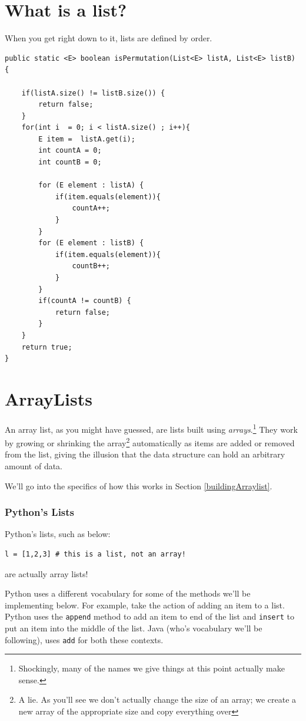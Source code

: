 \documentclass[10pt,a4paper]{book}
\begin{document}
\section{What is a list?}
When you get right down to it, lists are defined by order.


\begin{verbatim}
public static <E> boolean isPermutation(List<E> listA, List<E> listB) {
	
	if(listA.size() != listB.size()) {
		return false;
	}
	for(int i  = 0; i < listA.size() ; i++){
		E item =  listA.get(i);
		int countA = 0;
		int countB = 0;
		
		for (E element : listA) {
			if(item.equals(element)){
				countA++;
			}
		}
		for (E element : listB) {
			if(item.equals(element)){
				countB++;
			}
		}
		if(countA != countB) {
			return false;
		}
	}
	return true;
}
\end{verbatim}



\section{ArrayLists}
An array list, as you might have guessed, are lists built using \textit{arrays}.\footnote{Shockingly, many of the names we give things at this point actually make sense.}
They work by growing or shrinking the array\footnote{A lie.  As you'll see we don't actually change the size of an array;  we create a new array of the appropriate size and copy everything over} automatically as items are added or removed from the list, giving the illusion that the data structure can hold an arbitrary amount of data.

We'll go into the specifics of how this works in Section \ref{buildingArraylist}.


\subsubsection{Python's Lists}
Python's lists, such as below:
\begin{verbatim}
l = [1,2,3] # this is a list, not an array!	
\end{verbatim}
are actually array lists! %

Python uses a different vocabulary for some of the methods we'll be implementing below.  
For example, take the action of adding an item to a list.
Python uses the \texttt{append} method to add an item to end of the list and \texttt{insert} to put an item into the middle of the list.
Java (who's vocabulary we'll be following), uses \texttt{add} for both these contexts. 
\end{document}
